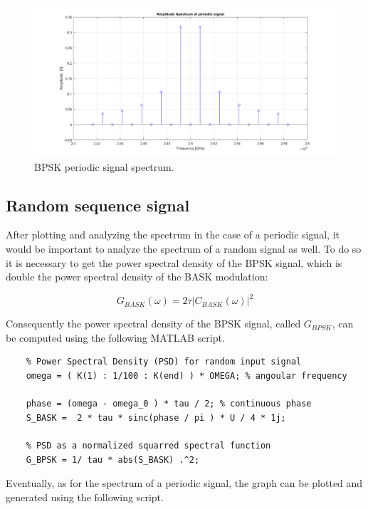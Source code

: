 \begin{figure}[h]
    \centering
    \includegraphics[width = \textwidth]{../res/imgs/periodic-signal-spectrum.png}
    \caption{BPSK periodic signal spectrum.}
    \label{fig:periodic-signal-spectrum}
\end{figure}


\subsection{Random sequence signal}
After plotting and analyzing the spectrum in the case of a periodic signal, it would be important to analyze the spectrum of a random signal as well. To do so it is necessary to get the power spectral density of the BPSK signal, which is double the power spectral density of the BASK modulation:

\begin{equation*}
    G_{BASK}(\omega) = 2\tau|C_{BASK}(\omega)|^2
\end{equation*}

\noindent Consequently the power spectral density of the BPSK signal, called $G_{BPSK}$, can be computed using the following MATLAB script.

\begin{lstlisting}
    % Power Spectral Density (PSD) for random input signal
    omega = ( K(1) : 1/100 : K(end) ) * OMEGA; % angoular frequency 

    phase = (omega - omega_0 ) * tau / 2; % continuous phase 
    S_BASK =  2 * tau * sinc(phase / pi ) * U / 4 * 1j;

    % PSD as a normalized squarred spectral function
    G_BPSK = 1/ tau * abs(S_BASK) .^2;
\end{lstlisting}

\noindent Eventually, as for the spectrum of a periodic signal, the graph can be plotted and generated using the following script.

